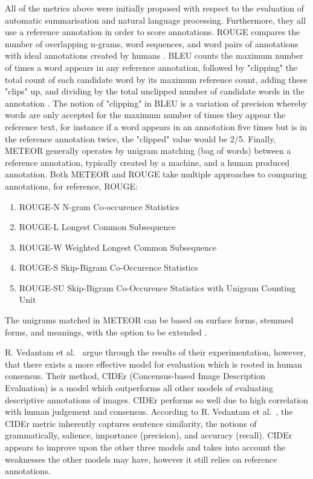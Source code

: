 \documentclass[12pt,a4paper]{article}
\begin{document}
All of the metrics above were initially proposed with respect to the evaluation of automatic summarisation and natural language processing. Furthermore, they all use a reference annotation in order to score annotations. ROUGE compares the number of overlapping n-grams, word sequences, and word pairs of annotations with ideal annotations created by humans \citep{lin2004rouge}. BLEU counts the maximum number of times a word appears in any reference annotation, followed by "clipping" the total count of each candidate word by its maximum reference count, adding these "clips" up, and dividing by the total unclipped number of candidate words in the annotation \citep{papineni2002bleu}. The notion of "clipping" in BLEU is a variation of precision whereby words are only accepted for the maximum number of times they appear the reference text, for instance if a word appears in an annotation five times but is in the reference annotation twice, the "clipped" value would be 2/5. Finally, METEOR generally operates by unigram matching (bag of words) between a reference annotation, typically created by a machine, and a human produced annotation. Both METEOR and ROUGE take multiple approaches to comparing annotations, for reference, ROUGE:
\begin{enumerate}
    \item ROUGE-N N-gram Co-occurence Statistics
    \item ROUGE-L Longest Common Subsequence
    \item ROUGE-W Weighted Longest Common Subsequence
    \item ROUGE-S Skip-Bigram Co-Occurence Statistics
    \item ROUGE-SU Skip-Bigram Co-Occurence Statistics with Unigram Counting Unit
\end{enumerate}
The unigrams matched in METEOR can be based on surface forms, stemmed forms, and meanings, with the option to be extended \citep{elliott2013image}.

R. Vedantam et al.~\citep{vedantam2015cider} argue through the results of their experimentation, however, that there exists a more effective model for evaluation which is rooted in human consensus. Their method, CIDEr (Concensus-based Image Description Evaluation) is a model which outperforms all other models of evaluating descriptive annotations of images. CIDEr performs so well due to high correlation with human judgement and consensus. According to R. Vedantam et al.~\cite{vedantam2015cider}, the CIDEr metric inherently captures sentence similarity, the notions of grammatically, salience, importance (precision), and accuracy (recall). CIDEr appears to improve upon the other three models and takes into account the weaknesses the other models may have, however it still relies on reference annotations.
\end{document}
